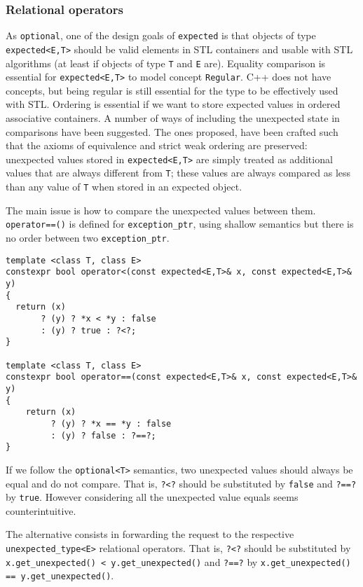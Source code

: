 \documentclass[a4paper,10pt]{article}
\newcommand{\cpp}[1]{\lstinline{#1}}
\begin{document}
\subsubsection{Relational operators}

As \cpp{optional}, one of the design goals of \cpp{expected} is that objects of type \cpp{expected<E,T>} should be valid elements in STL containers and usable with STL algorithms (at least if objects of type \cpp{T} and \cpp{E} are). Equality comparison is essential for \cpp{expected<E,T>} to model concept \cpp{Regular}. C++ does not have concepts, but being regular is still essential for the type to be effectively used with STL. Ordering is essential if we want to store expected values in ordered associative containers. A number of ways of including the unexpected state in comparisons have been suggested. The ones proposed, have been crafted such that the axioms of equivalence and strict weak ordering are preserved: unexpected values stored in \cpp{expected<E,T>} are simply treated as additional values that are always different from \cpp{T}; these values are always compared as less than any value of \cpp{T} when stored in an expected object. 
   
The main issue is how to compare the unexpected values between them.  \cpp{operator==()} is defined for \cpp{exception_ptr}, using shallow semantics but there is no order between two \cpp{exception_ptr}.

\begin{lstlisting}
template <class T, class E>
constexpr bool operator<(const expected<E,T>& x, const expected<E,T>& y)
{
  return (x)
       ? (y) ? *x < *y : false
       : (y) ? true : ?<?;
}

template <class T, class E>
constexpr bool operator==(const expected<E,T>& x, const expected<E,T>& y)
{
    return (x)
         ? (y) ? *x == *y : false
         : (y) ? false : ?==?;
}
\end{lstlisting}

If we follow the \cpp{optional<T>} semantics, two unexpected values should always be equal and do not compare. That is, \cpp{?<?} should be substituted by \cpp{false} and \cpp{?==?} by \cpp{true}. However considering all the unexpected value equals seems counterintuitive.

The alternative consists in forwarding the request to the respective  \cpp{unexpected_type<E>} relational operators. That is, \cpp{?<?} should be substituted by \cpp{x.get_unexpected() < y.get_unexpected()} and \cpp{?==?} by \cpp{x.get_unexpected() == y.get_unexpected()}. 
\end{document}
